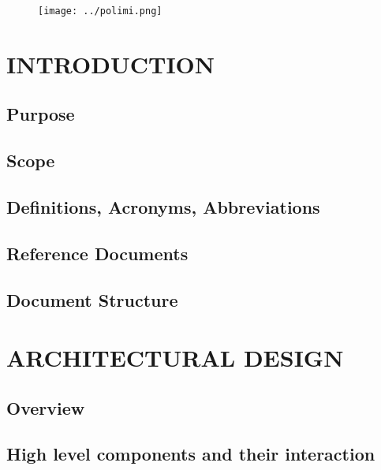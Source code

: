 \documentclass{article}
\begin{document}

	\begin{figure}[h]

		\centerline{
			\texttt{[image: ../polimi.png]}
		}
	
	\end{figure}

	\clearpage

	\tableofcontents

	\clearpage


	\section{INTRODUCTION}

		\subsection{Purpose}

		\subsection{Scope}

		\subsection{Definitions, Acronyms, Abbreviations}

		\subsection{Reference Documents}

		\subsection{Document Structure}


	\section{ARCHITECTURAL DESIGN}

		\subsection{Overview}

		\subsection{High level components and their interaction}
\end{document}
